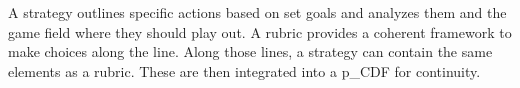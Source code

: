 A strategy outlines specific actions based on set goals and analyzes them and the game field where they should play out. A rubric provides a coherent framework to make choices along the line. Along those lines, a strategy can contain the same elements as a rubric. These are then integrated into a \gls{p_CDF} for continuity.
